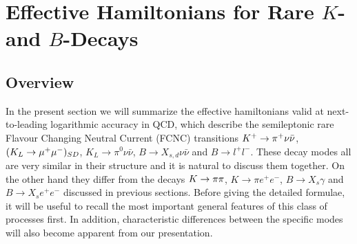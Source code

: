\section{Effective Hamiltonians for Rare $K$- and $B$-Decays}
         \label{sec:HeffRareKB}
\subsection{Overview}
            \label{sec:HeffRareKB:overview}
In the present section we will summarize the effective hamiltonians
valid at next-to-leading logarithmic accuracy in QCD, which describe
the semileptonic rare Flavour Changing Neutral Current (FCNC)
transitions $K^+ \to \pi^+\nu\bar\nu$, $(K_L \to \mu^+\mu^-)_{SD}$, $K_L\to\pi^0\nu\bar\nu$, $B\to X_{s,
d}\nu\bar\nu$ and $B\to l^+l^-$.  These decay modes all are very
similar in their structure and it is natural to discuss them together.
On the other hand they differ from the decays $K \to \pi\pi$, $K \to \pi e^+
e^-$, $B \to X_s \gamma$ and $B \to X_s e^+ e^-$ discussed in previous
sections. Before giving the detailed formulae, it will be useful to
recall the most important general features of this class of processes
first. In addition, characteristic differences between the specific
modes will also become apparent from our presentation.
